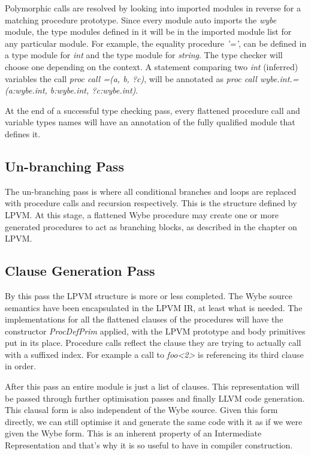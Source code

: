 Polymorphic calls are resolved by looking into imported modules in reverse for
a matching procedure prototype. Since every module auto imports the
\textit{wybe} module, the type modules defined in it will be in the imported
module list for any particular module. For example, the equality procedure
\textit{'='}, can be defined in a type module for \textit{int} and the type
module for \textit{string}. The type checker will choose one depending on the
context. A statement comparing two \textit{int} (inferred) variables the call
\textit{proc call =(a, b, ?c)}, will be annotated as \textit{proc call
  wybe.int.=(a:wybe.int, b:wybe.int, ?c:wybe.int)}.

At the end of a successful type checking pass, every flattened procedure call
and variable types names will have an annotation of the fully qualified module
that defines it.


\subsection{Un-branching Pass}

The un-branching pass is where all conditional branches and loops are replaced
with procedure calls and recursion respectively. This is the structure defined
by LPVM. At this stage, a flattened Wybe procedure may create one or more
generated procedures to act as branching blocks, as described in the chapter on
LPVM. 


\subsection{Clause Generation Pass}

By this pass the LPVM structure is more or less completed. The Wybe source
semantics have been encapsulated in the LPVM IR, at least what is needed. The
implementations for all the flattened clauses of the procedures will have the
constructor \textit{ProcDefPrim} applied, with the LPVM prototype and body
primitives put in its place. Procedure calls reflect the clause they are trying
to actually call with a suffixed index. For example a call to \textit{foo<2>}
is referencing its third clause in order. 

After this pass an entire module is just a list of clauses. This representation
will be passed through further optimisation passes and finally LLVM code
generation. This clausal form is also independent of the Wybe source. Given
this form directly, we can still optimise it and generate the same code with it
as if we were given the Wybe form. This is an inherent property of an
Intermediate Representation and that's why it is so useful to have in compiler
construction.


